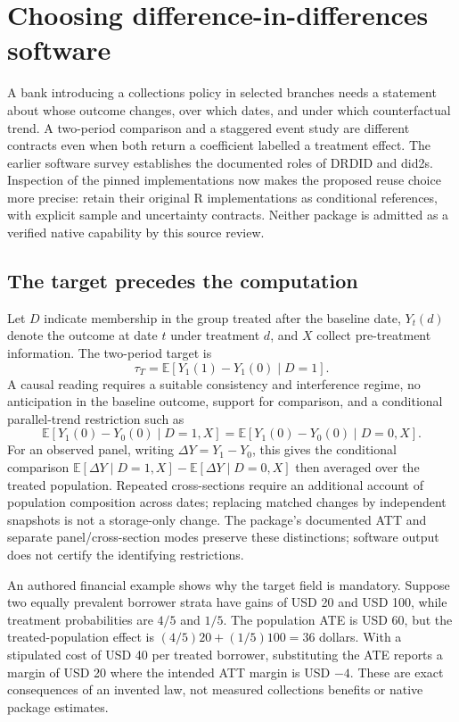 \section{Choosing difference-in-differences software}
\label{sec:exec24-panel-reuse}
A bank introducing a collections policy in selected branches needs a statement
about whose outcome changes, over which dates, and under which counterfactual
trend. A two-period comparison and a staggered event study are different
contracts even when both return a coefficient labelled a treatment effect.
The earlier software survey establishes the documented roles of DRDID and
did2s. Inspection of the pinned implementations now makes the proposed reuse
choice more precise: retain their original R implementations as conditional
references, with explicit sample and uncertainty contracts. Neither package is
admitted as a verified native capability by this source review.
\citep{v12_sw_drdid,v12_sw_did2s,exec24_drdid_reuse_source,exec24_did2s_reuse_source}

\subsection{The target precedes the computation}
Let $D$ indicate membership in the group treated after the baseline date,
$Y_t(d)$ denote the outcome at date $t$ under treatment $d$, and $X$ collect
pre-treatment information. The two-period target is
\[
 \tau_T=\mathbb E[Y_1(1)-Y_1(0)\mid D=1].
\]
A causal reading requires a suitable consistency and interference regime,
no anticipation in the baseline outcome, support for comparison, and a
conditional parallel-trend restriction such as
\[
 \mathbb E[Y_1(0)-Y_0(0)\mid D=1,X]
 =\mathbb E[Y_1(0)-Y_0(0)\mid D=0,X].
\]
For an observed panel, writing $\Delta Y=Y_1-Y_0$, this gives the conditional
comparison $\mathbb E[\Delta Y\mid D=1,X]-\mathbb E[\Delta Y\mid D=0,X]$
then averaged over the treated population. Repeated cross-sections require
an additional account of population composition across dates; replacing
matched changes by independent snapshots is not a storage-only change.
The package's documented ATT and separate panel/cross-section modes preserve
these distinctions; software output does not certify the identifying
restrictions.~\citep{v12_sw_drdid,exec24_drdid_reuse_source}

An authored financial example shows why the target field is mandatory.
Suppose two equally prevalent borrower strata have gains of USD 20 and USD 100,
while treatment probabilities are $4/5$ and $1/5$. The population ATE is
USD 60, but the treated-population effect is
$(4/5)20+(1/5)100=36$ dollars. With a stipulated cost of USD 40 per treated
borrower, substituting the ATE reports a margin of USD 20 where the intended
ATT margin is USD $-4$. These are exact consequences of an invented law,
not measured collections benefits or native package estimates.
\citep{exec24_panel_reuse_reference}

